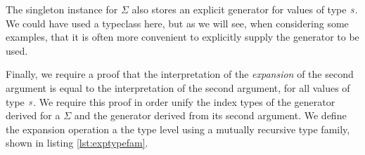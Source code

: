 \documentclass[a4paper,msc,twosized=semi]{uustthesis}
\let\oldemph\emph
\renewcommand\emph[1]{{\large\oldemph{#1}}}
\newcommand*{\mathcolor}{}
\def\mathcolor#1#{\mathcoloraux{#1}}
\newcommand*{\mathcoloraux}[3]{%
  \protect\leavevmode
  \begingroup
    \color#1{#2}#3%
  \endgroup
}
\newcommand{\HSVar}[1]{\mathcolor{hsblue5}{\mathit{#1}}}
\begin{document}
  The singleton instance for \ensuremath{\Sigma } also stores an explicit generator for values of 
  type \ensuremath{\HSVar{s}}. We could have used a typeclass here, but as we will see, when considering 
  some examples, that it is often more convenient to explicitly supply the generator 
  to be used. 


  
  Finally, we require a proof that the interpretation of the \emph{expansion} of the 
  second argument is equal to the interpretation of the second argument, for all 
  values of type \ensuremath{\HSVar{s}}. We require this proof in order unify the index types of the 
  generator derived for a \ensuremath{\Sigma } and the generator derived from its second argument. 
  We define the expansion operation a the type level using a mutually recursive type 
  family, shown in listing \ref{lst:exptypefam}. 
\end{document}
